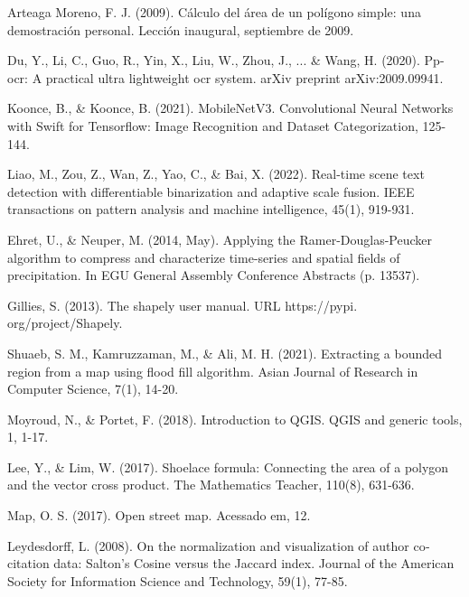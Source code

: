 \documentclass[twocolumn, fontsize=10pt]{article}
\begin{document}
\begin{thebibliography}{}

  \sloppypar
   Arteaga Moreno, F. J. (2009). Cálculo del área de un polígono simple: una demostración personal. Lección inaugural, septiembre de 2009.


   Du, Y., Li, C., Guo, R., Yin, X., Liu, W., Zhou, J., ... \& Wang, H. (2020). Pp-ocr: A practical ultra lightweight ocr system. arXiv preprint arXiv:2009.09941. 

     Koonce, B., \& Koonce, B. (2021). MobileNetV3. Convolutional Neural Networks with Swift for Tensorflow: Image Recognition and Dataset Categorization, 125-144.

     Liao, M., Zou, Z., Wan, Z., Yao, C., \& Bai, X. (2022). Real-time scene text detection with differentiable binarization and adaptive scale fusion. IEEE transactions on pattern analysis and machine intelligence, 45(1), 919-931.

     Ehret, U., \& Neuper, M. (2014, May). Applying the Ramer-Douglas-Peucker algorithm to compress and characterize time-series and spatial fields of precipitation. In EGU General Assembly Conference Abstracts (p. 13537).

     Gillies, S. (2013). The shapely user manual. URL https://pypi. org/project/Shapely.

     Shuaeb, S. M., Kamruzzaman, M., \& Ali, M. H. (2021). Extracting a bounded region from a map using flood fill algorithm. Asian Journal of Research in Computer Science, 7(1), 14-20.

     Moyroud, N., \& Portet, F. (2018). Introduction to QGIS. QGIS and generic tools, 1, 1-17.

     Lee, Y., \& Lim, W. (2017). Shoelace formula: Connecting the area of a polygon and the vector cross product. The Mathematics Teacher, 110(8), 631-636.

     Map, O. S. (2017). Open street map. Acessado em, 12.

     Leydesdorff, L. (2008). On the normalization and visualization of author co‐citation data: Salton's Cosine versus the Jaccard index. Journal of the American Society for Information Science and Technology, 59(1), 77-85.
    
\end{thebibliography}
    
    
\end{document}
